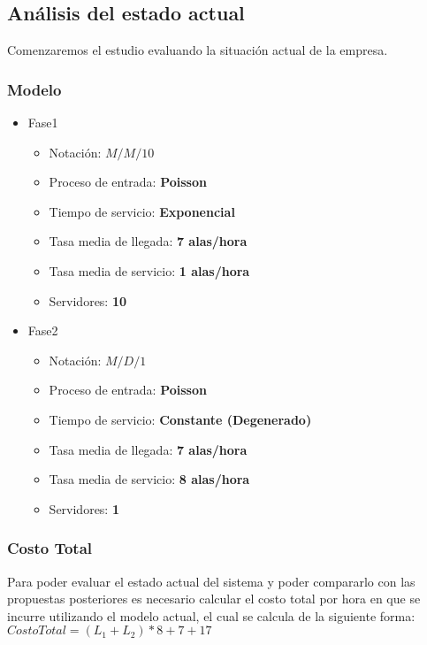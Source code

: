 \documentclass{article}
\begin{document}
\subsection{Análisis del estado actual}
Comenzaremos el estudio evaluando la situación actual de la empresa.
\subsubsection{Modelo}
\begin{itemize}
	\item Fase1
		\begin{itemize}
			\item \large{Notación: } \textbf{$M/M/10$}
			\item \large{Proceso de entrada: } \textbf{Poisson}
			\item \large{Tiempo de servicio: } \textbf{Exponencial}
			\item \large{Tasa media de llegada: } \textbf{7 alas/hora}
			\item \large{Tasa media de servicio: } \textbf{1 alas/hora}
			\item \large{Servidores: } \textbf{10}
		\end{itemize}
	\item Fase2
		\begin{itemize}
			\item \large{Notación: } \textbf{$M/D/1$}
			\item \large{Proceso de entrada: } \textbf{Poisson}
			\item \large{Tiempo de servicio: } \textbf{Constante (Degenerado)}
			\item \large{Tasa media de llegada: } \textbf{7 alas/hora}
			\item \large{Tasa media de servicio: } \textbf{8 alas/hora}
			\item \large{Servidores: } \textbf{1}
		\end{itemize}
\end{itemize}

\subsubsection{Costo Total}
Para poder evaluar el estado actual del sistema y poder compararlo con las propuestas
posteriores es necesario calcular el costo total por hora en que se incurre utilizando
el modelo actual, el cual se calcula de la siguiente forma: \\
$ CostoTotal = \left(L_{1}+L_{2}\right)*8+7+17$ \\\\
\end{document}
